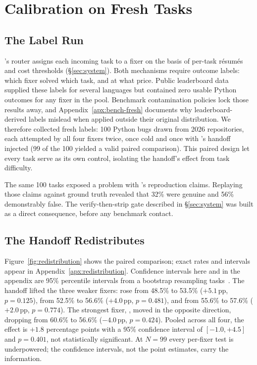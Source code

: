 \section{Calibration on Fresh Tasks}
\label{sec:calibration}

\subsection{The Label Run}
\label{sec:calib-labels}

\sysname's router assigns each incoming task to a fixer on the basis of per-task r\'{e}sum\'{e}s and cost thresholds (\S\ref{sec:system}).
Both mechanisms require outcome labels: which fixer solved which task, and at what price.
Public leaderboard data supplied these labels for several languages but contained zero usable Python outcomes for any fixer in the pool.
Benchmark contamination policies lock those results away, and Appendix~\ref{apx:bench-fresh} documents why leaderboard-derived labels mislead when applied outside their original distribution.
We therefore collected fresh labels: 100 Python bugs drawn from 2026 repositories, each attempted by all four fixers twice, once cold and once with \modelname's handoff injected (99 of the 100 yielded a valid paired comparison).
This paired design let every task serve as its own control, isolating the handoff's effect from task difficulty.

The same 100 tasks exposed a problem with \modelname's reproduction claims.
Replaying those claims against ground truth revealed that 32\% were genuine and 56\% demonstrably false.
The verify-then-strip gate described in \S\ref{sec:system} was built as a direct consequence, before any benchmark contact.

\subsection{The Handoff Redistributes}
\label{sec:calib-redist}

Figure~\ref{fig:redistribution} shows the paired comparison; exact rates and intervals appear in Appendix~\ref{apx:redistribution}.
Confidence intervals here and in the appendix are 95\% percentile
intervals from a bootstrap resampling tasks~\citep{bootstrap}.
The handoff lifted the three weaker fixers: \fxopus rose from 48.5\% to 53.5\% ($+5.1$\,pp, $p=0.125$), \fxkimi from 52.5\% to 56.6\% ($+4.0$\,pp, $p=0.481$), and \fxflash from 55.6\% to 57.6\% ($+2.0$\,pp,
$p=0.774$).
The strongest fixer, \fxgpt, moved in the opposite direction, dropping from 60.6\% to 56.6\% ($-4.0$\,pp, $p=0.424$).
Pooled across all four, the effect is $+1.8$ percentage points with a 95\% confidence interval of $[-1.0, {+}4.5]$ and $p=0.401$, not statistically significant.
At $N{=}99$ every per-fixer test is underpowered; the confidence intervals, not the point estimates, carry the information.

